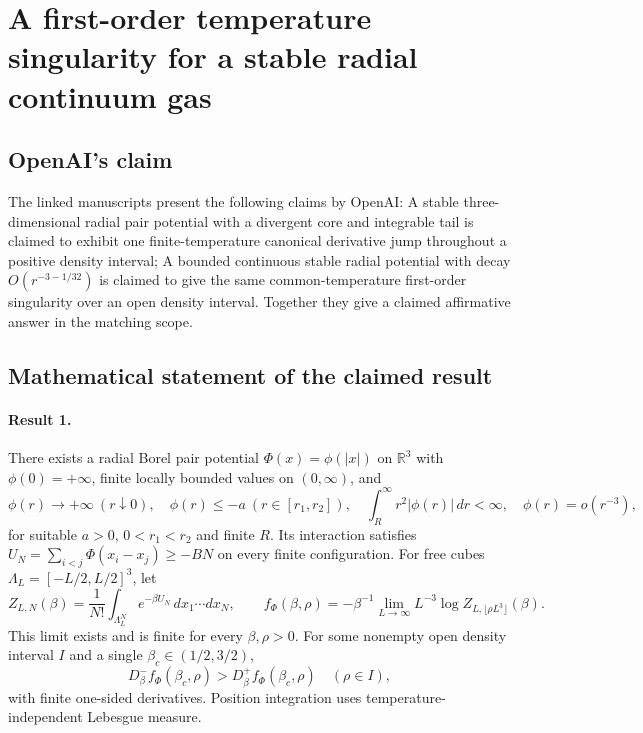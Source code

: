 \documentclass[11pt]{article}
\begin{document}
\section*{A first-order temperature singularity for a stable radial continuum gas}

\subsection{OpenAI's claim}
The linked manuscripts present the following claims by OpenAI: A stable three-dimensional radial pair potential with a divergent core and integrable tail is claimed to exhibit one finite-temperature canonical derivative jump throughout a positive density interval; A bounded continuous stable radial potential with decay $O(r^{-3-1/32})$ is claimed to give the same common-temperature first-order singularity over an open density interval. Together they give a claimed affirmative answer in the matching scope.

\subsection{Mathematical statement of the claimed result}
\paragraph{Result 1.} There exists a radial Borel pair potential $\Phi(x)=\phi(|x|)$ on $\mathbb R^3$ with $\phi(0)=+\infty$, finite locally bounded values on $(0,\infty)$, and
\[
 \phi(r)\to+\infty\ (r\downarrow0),\quad \phi(r)\le-a\ (r\in[r_1,r_2]),\quad
 \int_R^\infty r^2|\phi(r)|\,dr<\infty,\quad \phi(r)=o(r^{-3}),
\]
for suitable $a>0$, $0<r_1<r_2$ and finite $R$. Its interaction satisfies $U_N=\sum_{i<j}\Phi(x_i-x_j)\ge-BN$ on every finite configuration. For free cubes $\Lambda_L=[-L/2,L/2]^3$, let
\[
 Z_{L,N}(\beta)=\frac1{N!}\int_{\Lambda_L^N}e^{-\beta U_N}\,dx_1\cdots dx_N,\qquad
 f_\Phi(\beta,\rho)=-\beta^{-1}\lim_{L\to\infty}L^{-3}\log Z_{L,\lfloor\rho L^3\rfloor}(\beta).
\]
This limit exists and is finite for every $\beta,\rho>0$. For some nonempty open density interval $I$ and a single $\beta_c\in(1/2,3/2)$,
\[
 D^-_\beta f_\Phi(\beta_c,\rho)>D^+_\beta f_\Phi(\beta_c,\rho)\quad(\rho\in I),
\]
with finite one-sided derivatives. Position integration uses temperature-independent Lebesgue measure.
\end{document}
